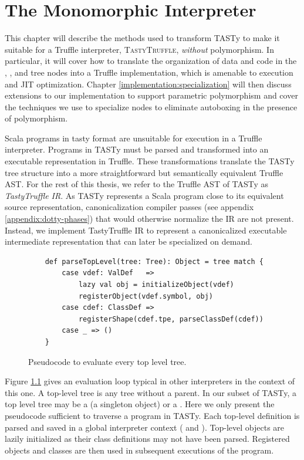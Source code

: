 \chapter{The Monomorphic Interpreter}
\label{chapter:implementation}

This chapter will describe the methods used to transform TASTy to make it suitable for a Truffle interpreter, \textsc{TastyTruffle}, \textit{without} polymorphism.
In particular, it will cover how to translate the organization of data and code in the , , and  tree nodes into a Truffle implementation, which is amenable to execution and JIT optimization.
Chapter \ref{implementation:specialization} will then discuss extensions to our implementation to support parametric polymorphism and cover the techniques we use to specialize nodes to eliminate autoboxing in the presence of polymorphism. 

Scala programs in \acrshort{tasty} format are unsuitable for execution in a Truffle interpreter. 
Programs in TASTy must be parsed and transformed into an executable representation in Truffle.
These transformations translate the TASTy tree structure into a more straightforward but semantically equivalent Truffle AST.
For the rest of this thesis, we refer to the Truffle AST of TASTy as \textit{TastyTruffle IR}.
As TASTy represents a Scala program close to its equivalent source representation, canonicalization compiler passes (see appendix \ref{appendix:dotty-phases}) that would otherwise normalize the IR are not present. 
Instead, we implement TastyTruffle IR to represent a canonicalized executable intermediate representation that can later be specialized on demand. 

\begin{figure}[!htb]
	\begin{verbatim}
	def parseTopLevel(tree: Tree): Object = tree match {
		case vdef: ValDef   => 
			lazy val obj = initializeObject(vdef)
			registerObject(vdef.symbol, obj)			
		case cdef: ClassDef => 
			registerShape(cdef.tpe, parseClassDef(cdef))	
		case _ => ()
	}
	\end{verbatim}
	\caption{Pseudocode to evaluate every top level tree.}
	\label{impl:top-level}
\end{figure}

Figure \ref{impl:top-level} gives an evaluation loop typical in other interpreters in the context of this one.
A top-level tree is any tree without a parent.
In our subset of TASTy, a top level tree may be a  (a singleton object) or a .
Here we only present the pseudocode sufficient to traverse a program in TASTy. 
Each top-level definition is parsed and saved in a global interpreter context ( and ).
Top-level objects are lazily initialized as their class definitions may not have been parsed.
Registered objects and classes are then used in subsequent executions of the program.

